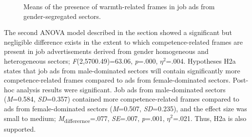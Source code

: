 \documentclass[jou]{apa7}
\begin{document}
\begin{figure*}
    \caption{Means of the presence of warmth-related frames in job ads from gender-segregated sectors.}
    \label{figure1}
    \end{figure*}

The second ANOVA model described in the  section showed a significant but negligible difference exists in the extent to which competence-related frames are present in job advertisements derived from gender homogeneous and heterogeneous sectors; \textit{F}(2,5700.49)=63.06, \textit{p}=.000, \textit{$\eta^2$}=.004. Hypotheses H2a states that job ads from male-dominated sectors will contain significantly more competence-related frames compared to ads from female-dominated sectors. Post-hoc analysis results were significant. Job ads from male-dominated sectors (\textit{M}=0.584, \textit{SD}=0.357) contained more competence-related frames compared to ads from female-dominated sectors (\textit{M}=0.507, \textit{SD}=0.235), and the effect size was small to medium; \textit{M}\textsubscript{differernce}=.077, \textit{SE}=.007, \textit{p}=.001, \textit{$\eta^2$}=.021. Thus, H2a is also supported.
\end{document}
